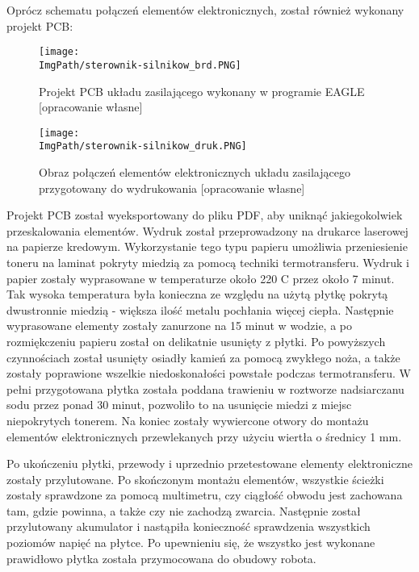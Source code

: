 \documentclass[a4paper,12pt,twoside,openany]{report}
\newcommand{\ImgPath}{.}
\begin{document}
Oprócz schematu połączeń elementów elektronicznych, został również wykonany projekt PCB:

\begin{figure}[!htbp]
	\begin{center}
\centering
\texttt{[image: \\ImgPath/sterownik-silnikow\_brd.PNG]}
\end{center}
	\caption{Projekt PCB układu zasilającego wykonany w programie EAGLE [opracowanie własne]}
	\label{schematKomunikacji}
\end{figure}

\begin{figure}[!htbp]
	\begin{center}
\centering
\texttt{[image: \\ImgPath/sterownik-silnikow\_druk.PNG]}
\end{center}
	\caption{Obraz połączeń elementów elektronicznych układu zasilającego przygotowany do wydrukowania [opracowanie własne]}
	\label{schematKomunikacji}
\end{figure}

\newpage
Projekt PCB został wyeksportowany do pliku PDF, aby uniknąć jakiegokolwiek przeskalowania elementów. Wydruk został przeprowadzony na drukarce laserowej na papierze kredowym. Wykorzystanie tego typu papieru umożliwia przeniesienie toneru na laminat pokryty miedzią za pomocą techniki termotransferu. Wydruk i papier zostały wyprasowane w temperaturze około 220 \textdegree C przez około 7 minut. Tak wysoka temperatura była konieczna ze względu na użytą płytkę pokrytą dwustronnie miedzią - większa ilość metalu pochłania więcej ciepła. Następnie wyprasowane elementy zostały zanurzone na 15 minut w wodzie, a po rozmiękczeniu papieru został on delikatnie usunięty z płytki. Po powyższych czynnościach został usunięty osiadły kamień za pomocą zwykłego noża, a także zostały poprawione wszelkie niedoskonałości powstałe podczas termotransferu. W pełni przygotowana płytka została poddana trawieniu w roztworze nadsiarczanu sodu przez ponad 30 minut, pozwoliło to na usunięcie miedzi z miejsc niepokrytych tonerem. Na koniec zostały wywiercone otwory do montażu elementów elektronicznych przewlekanych przy użyciu wiertła o średnicy 1 mm.

Po ukończeniu płytki, przewody i uprzednio przetestowane elementy elektroniczne zostały przylutowane. Po skończonym montażu elementów, wszystkie ścieżki zostały sprawdzone za pomocą multimetru, czy ciągłość obwodu jest zachowana tam, gdzie powinna, a także czy nie zachodzą zwarcia. Następnie został przylutowany akumulator i nastąpiła konieczność sprawdzenia wszystkich poziomów napięć na płytce. Po upewnieniu się, że wszystko jest wykonane prawidłowo płytka została przymocowana do obudowy robota.
\end{document}
